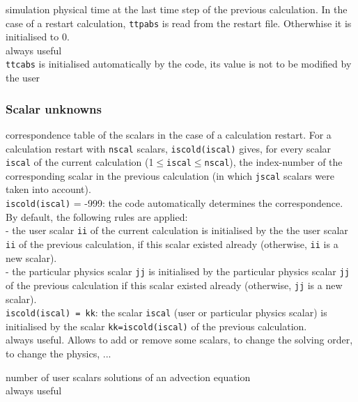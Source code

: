 {simulation physical time at the last time step of the previous
calculation. In the case of a restart calculation, {\tt ttpabs} is read from
the restart file. Otherwhise it is initialised to 0.\\
always useful\\
{\tt ttcabs} is initialised automatically by the code, its value is not to
be modified by the user}

\subsubsection{Scalar unknowns}


{correspondence table of the scalars in the case of a calculation
restart. For a calculation restart with {\tt nscal} scalars, {\tt iscold(iscal)}
gives, for every scalar {\tt iscal} of the current calculation
(1$\leqslant${\tt iscal}$\leqslant${\tt nscal}), the index-number of the
corresponding scalar in the previous calculation (in which {\tt jscal} scalars were
taken into account).\\
\hspace*{1.3cm} {\tt iscold(iscal)} = -999: the code automatically determines the
correspondence. By default, the following rules are applied:\\
\hspace*{2.cm} - the user scalar {\tt ii} of the current calculation is
initialised by the the user scalar {\tt ii} of the previous calculation, if
this scalar existed already (otherwise, {\tt ii} is a new scalar).\\
\hspace*{2.cm} - the particular physics scalar {\tt jj} is initialised by
the particular physics scalar {\tt jj} of the previous calculation if this
scalar existed already (otherwise, {\tt jj} is a new scalar).\\
\hspace*{1.3cm} {\tt iscold(iscal) = kk}: the scalar {\tt iscal} (user or particular
physics scalar) is initialised by the scalar {\tt kk=iscold(iscal)} of the
previous calculation.\\
always useful. Allows to add or remove some scalars, to change the
solving order, to change the physics, ...}

{number of user scalars solutions of an advection equation\\
always useful}

